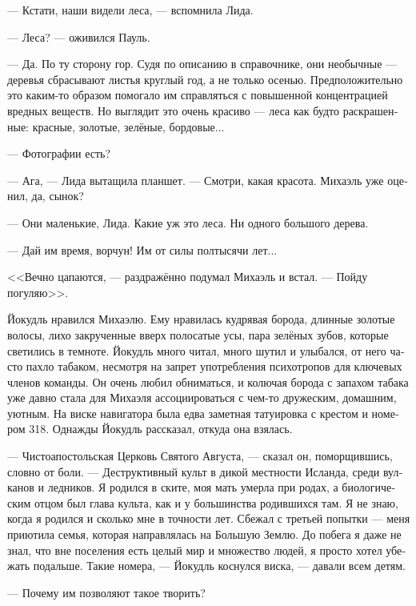 \documentclass[a4paper,10pt,fleqn]{book}\usepackage{polyglossia}\setdefaultlanguage[babelshorthands=true]{russian}\setotherlanguage{english}\defaultfontfeatures{Ligatures=TeX,Mapping=tex-text}\usepackage{xcolor}\newcommand{\ml}[3]{#2}
\newcommand{\asterism}{\vspace{1em}{\centering\Large\bfseries$\ast~\ast~\ast$\par}\vspace{1em}}
\begin{document}
--- Кстати, наши видели леса, --- вспомнила Лида.

--- Леса? --- оживился Пауль.

--- Да.
По ту сторону гор.
Судя по описанию в справочнике, они необычные --- деревья сбрасывают листья круглый год, а не только осенью.
Предположительно это каким-то образом помогало им справляться с повышенной концентрацией вредных веществ.
Но выглядит это очень красиво --- леса как будто раскрашенные: красные, золотые, зелёные, бордовые...

--- Фотографии есть?

--- Ага, --- Лида вытащила планшет.
--- Смотри, какая красота.
Михаэль уже оценил, да, сынок?

--- Они маленькие, Лида.
Какие уж это леса.
Ни одного большого дерева.

--- Дай им время, ворчун!
Им от силы полтысячи лет...

<<Вечно цапаются, --- раздражённо подумал Михаэль и встал.
--- Пойду погуляю>>.

\asterism

Йокудль нравился Михаэлю.
Ему нравилась кудрявая борода, длинные золотые волосы, лихо закрученные вверх полосатые усы, пара зелёных зубов, которые светились в темноте.
Йокудль много читал, много шутил и улыбался, от него часто пахло табаком, несмотря на запрет употребления психотропов для ключевых членов команды.
Он очень любил обниматься, и колючая борода с запахом табака уже давно стала для Михаэля ассоциироваться с чем-то дружеским, домашним, уютным.
На виске навигатора была едва заметная татуировка с крестом и номером 318.
Однажды Йокудль рассказал, откуда она взялась.

--- Чистоапостольская Церковь Святого Августа, --- сказал он, поморщившись, словно от боли.
\ml{$0$}
{--- Деструктивный культ в дикой местности Исланда, среди вулканов и ледников.}
{``A destructive cult from Island wilderness, among volcanos and glaciers.}
Я родился в ските, моя мать умерла при родах, а биологическим отцом был глава культа, как и у большинства родившихся там.
Я не знаю, когда я родился и сколько мне в точности лет.
\ml{$0$}
{Сбежал с третьей попытки --- меня приютила семья, которая направлялась на Большую Землю.}
{It took me three attempts to escape, the family which took me in was en route to the Mainland.}
До побега я даже не знал, что вне поселения есть целый мир и множество людей, я просто хотел убежать подальше.
Такие номера, --- Йокудль коснулся виска, --- давали всем детям.

--- Почему им позволяют такое творить?
\end{document}
